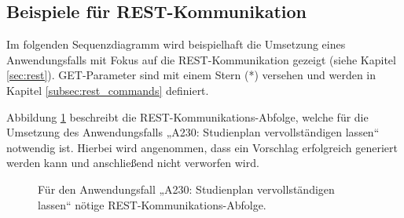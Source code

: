 \newcommand{\umlstddt}{3.5}
\newcommand{\umlfragmentdt}{7}
\newcommand{\umlstdafterfragmentdt}{5}
\newcommand{\umltwolinefragmentdt}{9.2}
\newcommand{\umltwolinealtdt}{10}
\newcommand{\umltwolinestddt}{7.2}

\FloatBarrier
\subsection{Beispiele für REST-Kommunikation}

Im folgenden Sequenzdiagramm wird beispielhaft die Umsetzung eines Anwendungsfalls mit Fokus auf die REST-Kommunikation gezeigt (siehe Kapitel \ref{sec:rest}). GET-Parameter sind mit einem Stern (*) versehen und werden in Kapitel \ref{subsec:rest_commands} definiert.

Abbildung \ref{seq:proc-rest-A230} beschreibt die REST-Kommunikations-Abfolge, welche für die Umsetzung des Anwendungsfalls „A230: Studienplan vervollständigen lassen“ notwendig ist. Hierbei wird angenommen, dass ein Vorschlag erfolgreich generiert werden kann und anschließend nicht verworfen wird.

\begin{figure}[H]
	
	\caption{Für den Anwendungsfall „A230: Studienplan vervollständigen lassen“ nötige REST-Kommunikations-Abfolge.}
	\label{seq:proc-rest-A230}
\end{figure}